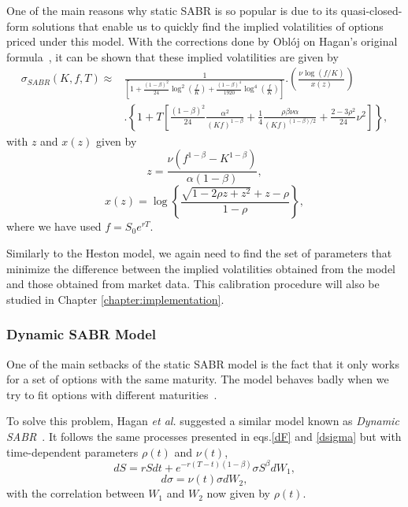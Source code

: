 One of the main reasons why static SABR is so popular is due to its quasi-closed-form solutions that enable us to quickly find the implied volatilities of options priced under this model. With the corrections done by Oblój on Hagan's original formula~\cite{Obloj}, it can be shown that these implied volatilities are given by
\begin{equation}\label{sabr}
\begin{split}
\sigma_{SABR}(K,f,T)\approx&\frac{1}{\displaystyle\left[1+\frac{(1-\beta)^2}{24}\log^2\left(\frac{f}{K}\right)+\frac{(1-\beta)^4}{1920}\log^4\left(\frac{f}{K}\right)\right]}.\left(\frac{\nu\log\left(f/K\right)}{x(z)}\right)\\
&.\left\{1+T\left[\frac{(1-\beta)^2}{24}\frac{\alpha^2}{(Kf)^{1-\beta}}+\frac{1}{4}\frac{\rho\beta\nu\alpha}{(Kf)^{(1-\beta)/2}}+\frac{2-3\rho^2}{24}\nu^2\right]\right\},
\end{split}
\end{equation}
\noindent with $z$ and $x(z)$ given by
\begin{equation}
z=\frac{\nu\left(f^{1-\beta}-K^{1-\beta}\right)}{\alpha(1-\beta)},
\end{equation}
\begin{equation}
x(z)=\log\left\{\frac{\sqrt{1-2\rho z+z^2}+z-\rho}{1-\rho}\right\},
\end{equation}
\noindent where we have used $f=S_0e^{rT}$.

Similarly to the Heston model, we again need to find the set of parameters that minimize the difference between the implied volatilities obtained from the model and those obtained from market data. This calibration procedure will also be studied in Chapter \ref{chapter:implementation}.


\subsubsection{Dynamic SABR Model}
One of the main setbacks of the static SABR model is the fact that it only works for a set of options with the same maturity. The model behaves badly when we try to fit options with different maturities~\cite{Hagan}. 

To solve this problem, Hagan \textit{et al.} suggested a similar model known as \emph{Dynamic SABR}~\cite{Hagan}. It follows the same processes presented in eqs.\eqref{dF} and \eqref{dsigma} but with time-dependent parameters $\rho(t)$ and $\nu(t)$,
\begin{equation}\label{dF2}
dS=rSdt+e^{-r(T-t)(1-\beta)}\sigma S^\beta dW_1,
\end{equation}
\begin{equation}\label{dsigma2}
d\sigma=\nu(t)\sigma dW_2,
\end{equation}
\noindent with the correlation between $W_1$ and $W_2$ now given by $\rho(t)$.

